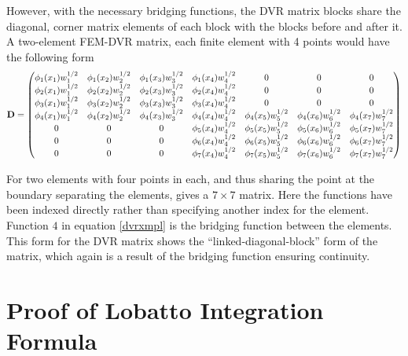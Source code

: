 \documentclass[preprint]{revtex4}
\begin{document}
However, with the necessary bridging functions, the DVR matrix blocks share the diagonal, corner
matrix elements of each block with the blocks before and after it. 
A two-element FEM-DVR matrix, each finite element with 4 points would have the following form
\begin{equation}
\label{dvrxmpl} 
{\bf D} = 
\begin{pmatrix} 
\phi_1(x_1)w^{1/2}_1 & \phi_1(x_2)w^{1/2}_2 & \phi_1(x_3)w^{1/2}_3 & \phi_1(x_4)w^{1/2}_4 & 0 & 0 & 0 \\
\phi_2(x_1)w^{1/2}_1 & \phi_2(x_2)w^{1/2}_2 & \phi_2(x_3)w^{1/2}_3 & \phi_2(x_4)w^{1/2}_4 & 0 & 0 & 0 \\
\phi_3(x_1)w^{1/2}_1 & \phi_3(x_2)w^{1/2}_2 & \phi_3(x_3)w^{1/2}_3 & \phi_3(x_4)w^{1/2}_4 & 0 & 0 & 0 \\
\phi_4(x_1)w^{1/2}_1 & \phi_4(x_2)w^{1/2}_2 & \phi_4(x_3)w^{1/2}_3 & \phi_4(x_4)w^{1/2}_4 & \phi_4(x_5)w^{1/2}_5 & \phi_4(x_6)w^{1/2}_6 & \phi_4(x_7)w^{1/2}_7 \\
0 & 0 & 0 & \phi_5(x_4)w^{1/2}_4 & \phi_5(x_5)w^{1/2}_5 & \phi_5(x_6)w^{1/2}_6 & \phi_5(x_7)w^{1/2}_7 \\
0 & 0 & 0 & \phi_6(x_4)w^{1/2}_4 & \phi_6(x_5)w^{1/2}_5 & \phi_6(x_6)w^{1/2}_6 & \phi_6(x_7)w^{1/2}_7 \\
0 & 0 & 0 & \phi_7(x_4)w^{1/2}_4 & \phi_7(x_5)w^{1/2}_5 & \phi_7(x_6)w^{1/2}_6 & \phi_7(x_7)w^{1/2}_7 \\
\end{pmatrix}
\end{equation}

For two elements with four points in each, and thus sharing the point at the boundary 
separating the elements, gives a $7\times7$ matrix. Here the functions have been indexed
directly rather than specifying another index for the element. Function $4$ in equation 
\ref{dvrxmpl} is the bridging function between the elements. 
This form for the DVR matrix shows the ``linked-diagonal-block'' form of the matrix, 
which again is a result of the bridging function ensuring continuity. 

\appendix
\section{Proof of Lobatto Integration Formula}
\label{lobatappend}

\end{document}

